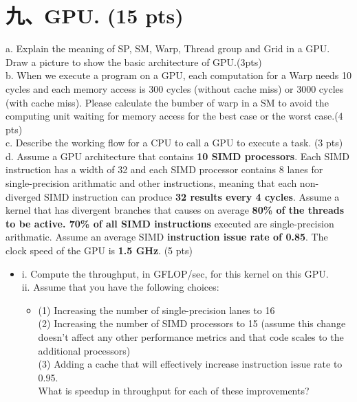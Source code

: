 \documentclass[UTF8]{ctexart}
\begin{document}
\section*{九、GPU. (15 pts)}
a. Explain the meaning of SP, SM, Warp, Thread group and Grid in a GPU. Draw a picture to show the basic architecture of GPU.(3pts)\\
b. When we execute a program on a GPU, each computation for a Warp needs 10 cycles and each memory access is 300 cycles (without cache miss) or 3000 
cycles (with cache miss). Please calculate the bumber of warp in a SM to avoid the computing unit waiting for memory access for the best case or the 
worst case.(4 pts)\\
c. Describe the working flow for a CPU to call a GPU to execute a task. (3 pts) \\
d. Assume a GPU architecture that contains {\bfseries 10 SIMD processors}. Each SIMD instruction has a width of 32 and each SIMD processor contains 8 
lanes for single-precision arithmatic and other instructions, meaning that each non-diverged SIMD instruction can produce {\bfseries 32 results every 
4 cycles}. Assume a kernel that has divergent branches that causes on average {\bfseries 80\% of the threads to be active. 70\% of all SIMD instructions} 
executed are single-precision arithmatic. Assume an average SIMD {\bfseries instruction issue rate of 0.85}. The clock speed of the GPU is {\bfseries 1.5 
GHz}. (5 pts)\\
\begin{itemize}
    \item[]
    i. Compute the throughput, in GFLOP/sec, for this kernel on this GPU.\\
    ii. Assume that you have the following choices:
    \begin{itemize}
        \item[]
        (1) Increasing the number of single-precision lanes to 16\\
        (2) Increasing the number of SIMD processors to 15 (assume this change doesn't affect any other performance metrics and that code scales 
to the additional processors)\\
        (3) Adding a cache that will effectively increase instruction issue rate to 0.95. \\
        What is speedup in throughput for each of these improvements?\\
    \end{itemize}
\end{itemize}
    
\end{document}
